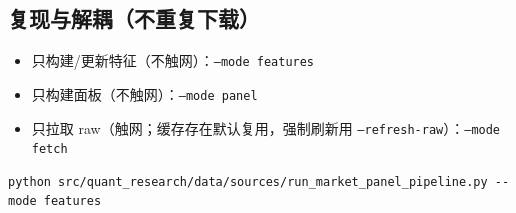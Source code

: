 \documentclass[11pt]{article}
\begin{document}
\subsection{复现与解耦（不重复下载）}
\begin{itemize}
  \item 只构建/更新特征（不触网）：\texttt{--mode features}
  \item 只构建面板（不触网）：\texttt{--mode panel}
  \item 只拉取 raw（触网；缓存存在默认复用，强制刷新用 \texttt{--refresh-raw}）：\texttt{--mode fetch}
\end{itemize}

\begin{verbatim}
python src/quant_research/data/sources/run_market_panel_pipeline.py --mode features
\end{verbatim}
\end{document}
